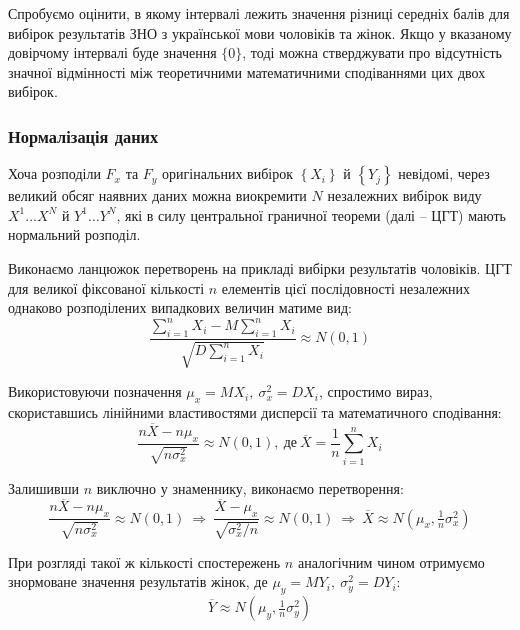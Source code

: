 Спробуємо оцінити, в якому інтервалі лежить значення різниці середніх балів для вибірок результатів ЗНО з 
української мови чоловіків та жінок. Якщо у вказаному довірчому інтервалі буде значення 
$\{0\}$, тоді можна стверджувати про відсутність значної відмінності між теоретичними 
математичними сподіваннями цих двох вибірок.

\subsubsection*{Нормалізація даних}

Хоча розподіли $F_x$ та $F_y$ оригінальних вибірок $\left\{ X_i \right\}$ й $\left\{ Y_j \right\}$ невідомі, 
через великий обсяг наявних даних можна виокремити $N$ незалежних вибірок виду $X^1\ldots X^N$ й 
$Y^1\ldots Y^N$, які в силу центральної граничної теореми (далі -- ЦГТ) мають нормальний розподіл.

Виконаємо ланцюжок перетворень на прикладі вибірки результатів чоловіків. ЦГТ для великої фіксованої кількості 
$n$ елементів цієї послідовності незалежних однаково розподілених випадкових величин матиме вид:
\begin{equation*}
    \frac{\sum\limits_{i=1}^nX_i-M\sum\limits_{i=1}^nX_i}{\sqrt{D\sum\limits_{i=1}^nX_i}}\approx N(0,1)
\end{equation*}

Використовуючи позначення $\mu_x=MX_i,\ \sigma_x^2=DX_i$, спростимо вираз, скориставшись лінійними 
властивостями дисперсії та математичного сподівання:
\begin{equation*}
    \frac{n\overline{X}-n\mu_x}{\sqrt{n\sigma_x^2}}\approx N(0,1),\ \text{де}\ \overline{X}=\frac{1}{n}\sum\limits_{i=1}^nX_i
\end{equation*}

Залишивши $n$ виключно у знаменнику, виконаємо перетворення:
\begin{equation*}
    \frac{n\overline{X}-n\mu_x}{\sqrt{n\sigma_x^2}}\approx N(0,1)\ \Rightarrow\ 
    \frac{\overline{X}-\mu_x}{\sqrt{\sigma_x^2/n}}\approx N(0,1)\ \Rightarrow\
    \overline{X}\approx N(\mu_x,\tfrac{1}{n}\sigma_x^2)
\end{equation*}

При розгляді такої ж кількості спостережень $n$ аналогічним чином отримуємо знормоване значення 
результатів жінок, де $\mu_y=MY_i,\ \sigma_y^2=DY_i:$
\begin{equation*}
    \overline{Y}\approx N(\mu_y,\tfrac{1}{n}\sigma_y^2)
\end{equation*}

